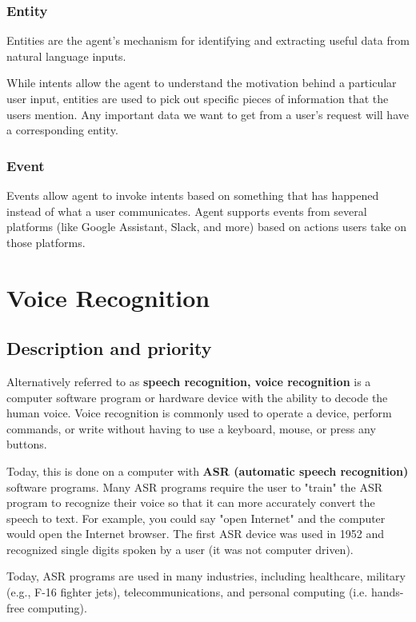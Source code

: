 \documentclass{scrreprt}
\begin{document}
\subsubsection{Entity}
Entities are the agent's mechanism for identifying and extracting useful data from natural language inputs.

While intents allow the agent to understand the motivation behind a particular user input, entities are used to pick out specific pieces of information that the users mention. Any important data we want to get from a user's request will have a corresponding entity.



\subsubsection{Event}

Events allow agent to invoke intents based on something that has happened instead of what a user communicates. Agent supports events from several platforms (like Google Assistant, Slack, and more) based on actions users take on those platforms.



\newpage
\section{Voice Recognition}




\subsection{Description and priority}
Alternatively referred to as \textbf{speech recognition, voice recognition} is a computer software program or hardware device with the ability to decode the human voice. Voice recognition is commonly used to operate a device, perform commands, or write without having to use a keyboard, mouse, or press any buttons.

Today, this is done on a computer with \textbf{ASR (automatic speech recognition)} software programs. Many ASR programs require the user to "train" the ASR program to recognize their voice so that it can more accurately convert the speech to text. For example, you could say "open Internet" and the computer would open the Internet browser.
The first ASR device was used in 1952 and recognized single digits spoken by a user (it was not computer driven).

Today, ASR programs are used in many industries, including healthcare, military (e.g., F-16 fighter jets), telecommunications, and personal computing (i.e. hands-free computing).
\end{document}
